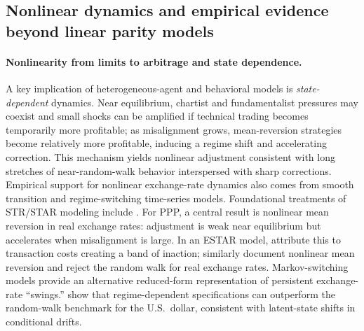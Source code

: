 \documentclass[a4paper,10pt,final]{article}    %
\begin{document}
\subsection{Nonlinear dynamics and empirical evidence beyond linear parity models}
\label{subsec:nonlinear}

\paragraph{Nonlinearity from limits to arbitrage and state dependence.}
A key implication of heterogeneous-agent and behavioral models is \emph{state-dependent} dynamics. Near equilibrium, chartist and fundamentalist pressures may coexist and small shocks can be amplified if technical trading becomes temporarily more profitable; as misalignment grows, mean-reversion strategies become relatively more profitable, inducing a regime shift and accelerating correction. This mechanism yields nonlinear adjustment consistent with long stretches of near-random-walk behavior interspersed with sharp corrections.
Empirical support for nonlinear exchange-rate dynamics also comes from smooth transition and regime-switching time-series models. Foundational treatments of STR/STAR modeling include \citet{GrangerTerasvirta1993,FransesVanDijk2000,Terasvirta1994,vanDijk2002,GrangerTerasvirta2010,TsayChen2019}. For PPP, a central result is nonlinear mean reversion in real exchange rates: adjustment is weak near equilibrium but accelerates when misalignment is large. In an ESTAR model, \citet{Michael1997} attribute this to transaction costs creating a band of inaction; \citet{TaylorPeelSarno2001} similarly document nonlinear mean reversion and reject the random walk for real exchange rates.
Markov-switching models provide an alternative reduced-form representation of persistent exchange-rate ``swings.'' \citet{EngelHamilton1990} show that regime-dependent specifications can outperform the random-walk benchmark for the U.S.\ dollar, consistent with latent-state shifts in conditional drifts.
\end{document}
